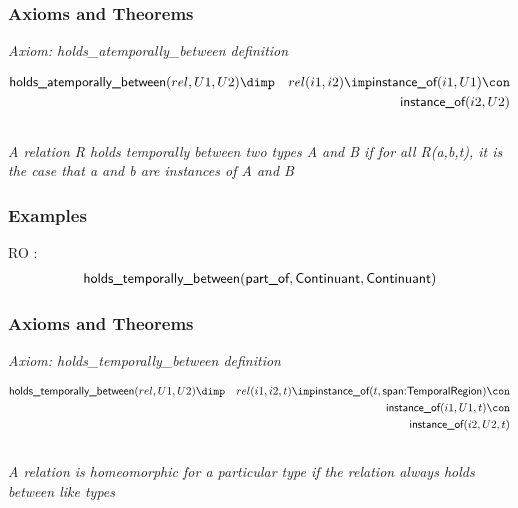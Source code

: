\subsubsection{Axioms and Theorems}


\emph{Axiom: holds\_atemporally\_between definition}

\begin{eqnarray*}
 \pr{holds\_atemporally\_between}(rel, U1, U2) &\dimp &rel(i1, i2) \imp  \pr{instance\_of}(i1, U1) \con \\
&& \pr{instance\_of}(i2, U2) 
\end{eqnarray*}

\subsection{ }
\emph{A relation R holds temporally between two types A and B if for all R(a,b,t), it is the case that a and b are instances of A and B}

\subsubsection{Examples}
\begin{clist}
\item RO : \begin{eqnarray*}
 \mbox{\sf holds\_temporally\_between}( \mbox{\sf part\_of},  \mbox{\sf Continuant},  \mbox{\sf Continuant}) 
\end{eqnarray*}

\end{clist}

\subsubsection{Axioms and Theorems}


\emph{Axiom: holds\_temporally\_between definition}

\begin{eqnarray*}
 \pr{holds\_temporally\_between}(rel, U1, U2) &\dimp &rel(i1, i2, t) \imp  \pr{instance\_of}(t,  \pr{span:TemporalRegion}) \con \\
&& \pr{instance\_of}(i1, U1, t) \con \\
&& \pr{instance\_of}(i2, U2, t) 
\end{eqnarray*}

\subsection{ }
\emph{A relation is homeomorphic for a particular type if the relation always holds between like types}

